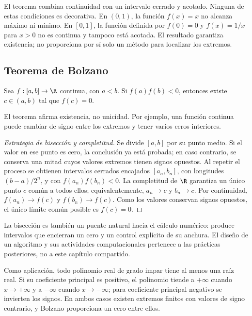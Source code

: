 El teorema combina continuidad con un intervalo cerrado y acotado. Ninguna de
estas condiciones es decorativa. En \((0,1)\), la función \(f(x)=x\) no
alcanza máximo ni mínimo. En \([0,1]\), la función definida por
\(f(0)=0\) y \(f(x)=1/x\) para \(x>0\) no es continua y tampoco está
acotada. El resultado garantiza existencia; no proporciona por sí solo un
método para localizar los extremos.

\subsection{Teorema de Bolzano}

\begin{teorema}
Sea \(f:[a,b]\to\R\) continua, con \(a<b\). Si
\(f(a)f(b)<0\), entonces existe \(c\in(a,b)\) tal que \(f(c)=0\).
\end{teorema}

El teorema afirma existencia, no unicidad. Por ejemplo, una función continua
puede cambiar de signo entre los extremos y tener varios ceros interiores.

\begin{proof}[Estrategia de bisección y completitud]
Se divide \([a,b]\) por su punto medio. Si el valor en ese punto es cero, la
conclusión ya está probada; en caso contrario, se conserva una mitad cuyos
valores extremos tienen signos opuestos. Al repetir el proceso se obtienen
intervalos cerrados encajados
\([a_n,b_n]\), con longitudes \((b-a)/2^n\), y con
\(f(a_n)f(b_n)<0\). La completitud de \(\R\) garantiza un único punto
\(c\) común a todos ellos; equivalentemente, \(a_n\to c\) y \(b_n\to c\).
Por continuidad, \(f(a_n)\to f(c)\) y \(f(b_n)\to f(c)\). Como los valores
conservan signos opuestos, el único límite común posible es \(f(c)=0\).
\end{proof}

La bisección es también un puente natural hacia el cálculo numérico: produce
intervalos que encierran un cero y un control explícito de su anchura. El
diseño de un algoritmo y sus actividades computacionales pertenece a las
prácticas posteriores, no a este capítulo compartido.

Como aplicación, todo polinomio real de grado impar tiene al menos una raíz
real. Si su coeficiente principal es positivo, el polinomio tiende a
\(+\infty\) cuando \(x\to+\infty\) y a \(-\infty\) cuando
\(x\to-\infty\); para coeficiente principal negativo se invierten los signos.
En ambos casos existen extremos finitos con valores de signo contrario, y
Bolzano proporciona un cero entre ellos.

